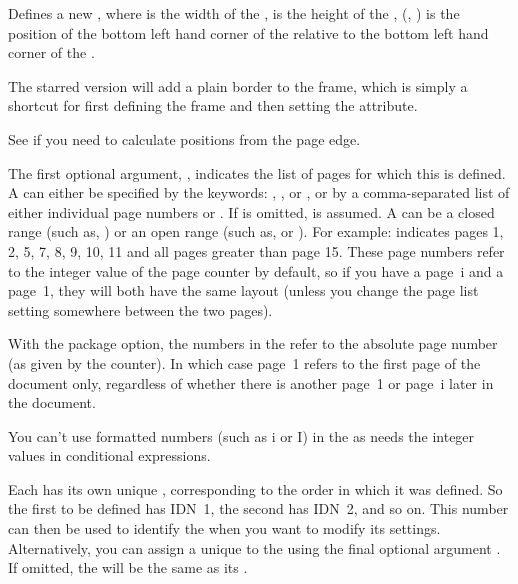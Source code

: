 \documentclass[fontsize=12pt]{scrbook}
\newcommand{\frameoptval}[2]{\optval{frame.#1}{#2}}
\begin{document}
Defines a new , where  is the width of the 
,  is the height of the , 
(, ) is the
position of the bottom left hand corner of the 
relative to the bottom left hand corner of the 
.

The starred version will add a plain border to the
\gls{frame}, which is simply a shortcut for first defining the frame
and then setting the \frameoptval{border}{plain} attribute.

\begin{information}
See  if you need to calculate positions
from the page edge.
\end{information}

The first optional argument, , indicates the 
list of pages for which this  is defined. 
A  can either be specified by the keywords: 
, ,  or , or 
by a comma-separated list of either individual page numbers or 
. If  is
omitted,  is assumed.  
A  can be a closed range (such as, ) or 
an open range (such as,  or ). 
For example: 
indicates pages 1, 2, 5, 7, 8, 9, 10, 11 and all pages 
greater than page 15. These page numbers refer to the integer value of
the page counter by default, so if you have a page~i and a page~1, they
will both have the same layout (unless you change the
page list setting somewhere between the two pages).

With the  package option, the numbers in the
 refer to the absolute page number (as given by the
 counter). In which case page~1
refers to the first page of the document only, regardless of whether
there is another page~1 or page~i later in the document.
 
\begin{information}
You can't use formatted numbers (such as i or I) in the 
as  needs the integer values in conditional expressions.
\end{information}

Each  has its own unique , 
corresponding to the order in which it was defined. So the first 
 to be defined has \gls*{IDN}~1, 
the second has \gls*{IDN}~2, and so on. This number can then
be used to identify the  when you want to modify its
settings. Alternatively, you can assign a unique  to the 
 using the final optional argument .
If omitted, the  will be the same as its .
\end{document}
